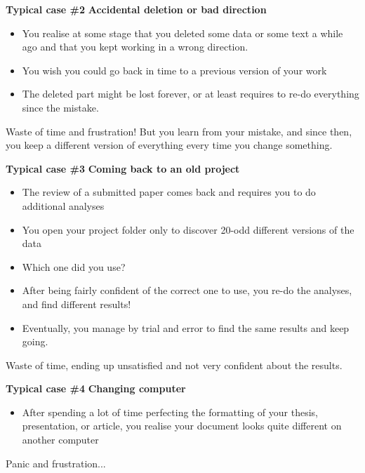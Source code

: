 \documentclass[9pt,xcolor=pdftex,dvipsnames,table]{beamer}
\begin{document}
\begin{frame}{\textbf{Typical case \#2}}
\textbf{Accidental deletion or bad direction}
\begin{itemize}
\item You realise at some stage that you deleted some data or some
  text a while ago and that you kept working in a wrong direction.
\item You wish you could go back in time to a previous version of your
  work
\item The deleted part might be lost forever, or at least requires to
  re-do everything since the mistake.
\end{itemize}
\vspace{0.6cm}
Waste of time and frustration! But you learn from your mistake, and
since then, you keep a different version of everything every time you
change something.
\vspace{-0.5cm}
\end{frame}

\begin{frame}{\textbf{Typical case \#3}}
\textbf{Coming back to an old project}
\begin{itemize}
\item The review of a submitted paper comes back and requires you to
  do additional analyses
\item You open your project folder only to discover 20-odd different
  versions of the data
\item Which one did you use?
\item After being fairly confident of the correct one to use, you
  re-do the analyses, and find different results!
\item Eventually, you manage by trial and error to find the same
  results and keep going.
\end{itemize}
\vspace{0.6cm}
Waste of time, ending up unsatisfied and not very confident about the results.
\vspace{-0.5cm}
\end{frame}


\begin{frame}{\textbf{Typical case \#4}}
\textbf{Changing computer}
\begin{itemize}
\item After spending a lot of time perfecting the formatting of your
  thesis, presentation, or article, you realise your document looks
  quite different on another computer
\end{itemize}
\vspace{0.6cm}
Panic and frustration...
\vspace{-0.5cm}
\end{frame}
\end{document}
